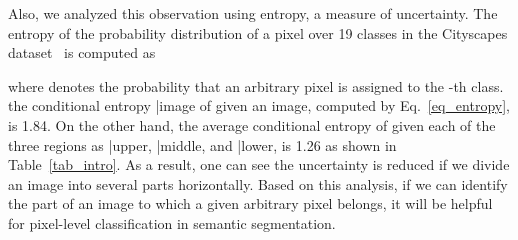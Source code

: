 \documentclass[10pt,twocolumn,letterpaper]{article}
\begin{document}
Also, we analyzed this observation using entropy, a measure of uncertainty. The entropy of the probability distribution  of a pixel over 19 classes in the Cityscapes dataset~\cite{cordts2016cityscapes} is computed as\\
\vspace*{-0.5cm}

where  denotes the probability that an arbitrary pixel is assigned to the -th class.
the conditional entropy \big|image of  given an image, computed by Eq.~\eqref{eq_entropy}, is 1.84. On the other hand, the average conditional entropy of  given each of the three regions as \big|upper, \big|middle, and \big|lower, is 1.26 as shown in Table~\ref{tab_intro}. As a result, one can see the uncertainty is reduced if we divide an image into several parts horizontally. Based on this analysis, if we can identify the part of an image to which a given arbitrary pixel belongs, it will be helpful for pixel-level classification in semantic segmentation.
\end{document}
